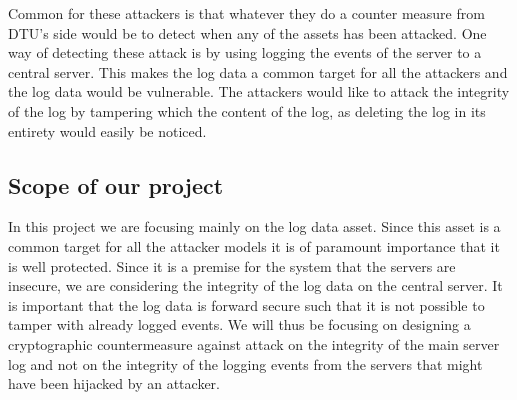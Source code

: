 Common for these attackers is that whatever they do a counter measure from DTU's side would be to detect when any of the assets has been attacked. One way of detecting these attack is by using logging the events of the server to a central server. This makes the log data a common target for all the attackers and the log data would be vulnerable. The attackers would like to attack the integrity of the log by tampering which the content of the log, as deleting the log in its entirety would easily be noticed.

\subsection{Scope of our project}
In this project we are focusing mainly on the log data asset. Since this asset is a common target for all the attacker models it is of paramount importance that it is well protected. Since it is a premise for the system that the servers are insecure, we are considering the integrity of the log data on the central server. It is important that the log data is forward secure such that it is not possible to tamper with already logged events. We will thus be focusing on designing a cryptographic countermeasure against attack on the integrity of the main server log and not on the integrity of the logging events from the servers that might have been hijacked by an attacker.




